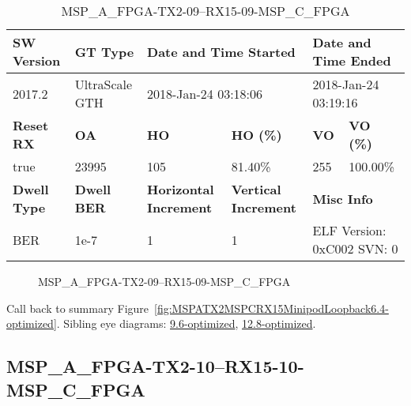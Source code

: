 \begin{table}[h]
\centering
\caption{MSP\_A\_FPGA-TX2-09--RX15-09-MSP\_C\_FPGA}
\label{tab:MSPAFPGATX209RX1509MSPCFPGA6.4-optimized}
\begin{tabular}{@{}|l|l|l|l|l|l|@{}}
\toprule
\textbf{SW Version}                & \textbf{GT Type}   & \multicolumn{2}{l|}{\textbf{Date and Time Started}}            & \multicolumn{2}{l|}{\textbf{Date and Time Ended}}        \\ \midrule
2017.2                       & UltraScale GTH          & \multicolumn{2}{l|}{2018-Jan-24 03:18:06}                   & \multicolumn{2}{l|}{2018-Jan-24 03:19:16}               \\ \midrule
\textbf{Reset RX}                  & \textbf{OA} & \textbf{HO}   & \textbf{HO (\%)} & \textbf{VO} & \textbf{VO (\%)} \\ \midrule
true & 23995        & 105          & 81.40\%        & 255        & 100.00\%       \\ \midrule
\textbf{Dwell Type}                & \textbf{Dwell BER} & \textbf{Horizontal Increment} & \textbf{Vertical Increment}    & \multicolumn{2}{l|}{\textbf{Misc Info}}                  \\ \midrule
BER                            & 1e-7        & 1        & 1           & \multicolumn{2}{l|}{ELF Version: 0xC002 SVN: 0}                         \\ \bottomrule
\end{tabular}
\end{table}

\begin{figure}[h]
\caption{MSP\_A\_FPGA-TX2-09--RX15-09-MSP\_C\_FPGA} \label{fig:MSPAFPGATX209RX1509MSPCFPGA6.4-optimized}
\end{figure}

Call back to summary Figure~\ref{fig:MSPATX2MSPCRX15MinipodLoopback6.4-optimized}.
Sibling eye diagrams: \hyperref[sec:MSPAFPGATX209RX1509MSPCFPGA9.6-optimized]{9.6-optimized}, \hyperref[sec:MSPAFPGATX209RX1509MSPCFPGA12.8-optimized]{12.8-optimized}.

\clearpage
\newpage


\subsection{MSP\_A\_FPGA-TX2-10--RX15-10-MSP\_C\_FPGA}\label{sec:MSPAFPGATX210RX1510MSPCFPGA6.4-optimized}

